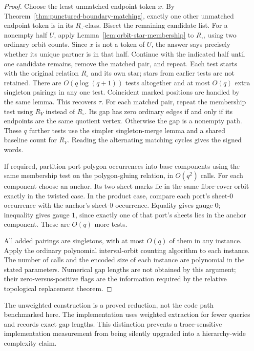 \begin{proof}
Choose the least unmatched endpoint token $x$.  By
Theorem~\ref{thm:punctured-boundary-matching}, exactly one other unmatched
endpoint token is in its $R_\circ$-class.  Bisect the remaining candidate
list.  For a nonempty half $U$, apply
Lemma~\ref{lem:orbit-star-membership} to $R_\circ$, using two ordinary orbit
counts.  Since $x$ is not a token of $U$, the answer says precisely whether
its unique partner is in that half.  Continue with the indicated half until
one candidate remains, remove the matched pair, and repeat.  Each test starts
with the original relation $R_\circ$ and its own star; stars from earlier
tests are not retained.  There are $O(q\log(q+1))$ tests altogether and at
most $O(q)$ extra singleton pairings in any one test.  Coincident marked
positions are handled by the same lemma.  This recovers $\tau$.
For each matched pair, repeat the membership test using $R_V$ instead of
$R_\circ$.  Its gap has zero ordinary edges if and only if its endpoints
are the same quotient vertex.  Otherwise the gap is a nonempty path.
These $q$ further tests use the simpler singleton-merge lemma and a shared
baseline count for $R_V$.  Reading the alternating matching cycles gives
the signed words.

If required, partition port polygon occurrences into base components using
the same membership test on the polygon-gluing relation, in $O(q^2)$ calls.
For each component choose an anchor.  Its two sheet marks lie in the same
fibre-cover orbit exactly in the twisted case.  In the product case,
compare each port's sheet-$0$ occurrence with the anchor's sheet-$0$
occurrence.  Equality gives gauge $0$; inequality gives gauge $1$, since
exactly one of that port's sheets lies in the anchor component.  These are
$O(q)$ more tests.

All added pairings are singletons, with at most $O(q)$ of them in any
instance.  Apply the ordinary polynomial interval-orbit counting algorithm
to each instance.  The number of calls and the encoded size of each instance
are polynomial in the stated parameters.  Numerical gap lengths are not
obtained by this argument; their zero-versus-positive flags are the
information required by the relative topological replacement theorem.
\end{proof}

The unweighted construction is a proved reduction, not the code path
benchmarked here.  The implementation uses weighted extraction for fewer
queries and records exact gap lengths.  This distinction prevents a
trace-sensitive implementation measurement from being silently upgraded
into a hierarchy-wide complexity claim.

